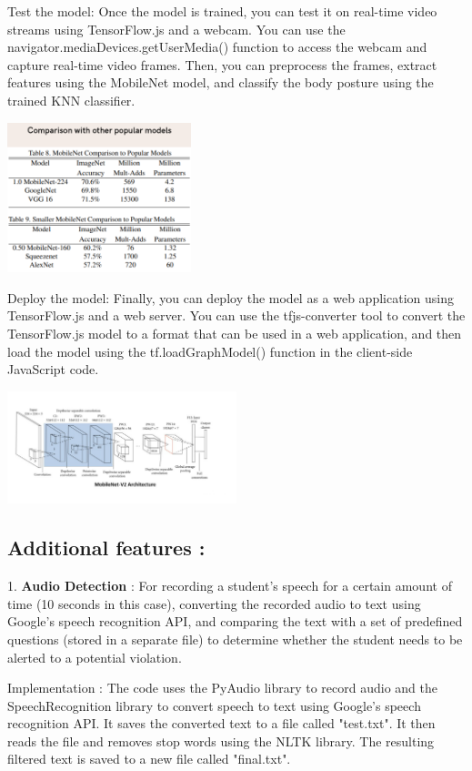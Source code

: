 \documentclass[journal]{IEEEtran}
\begin{document}
Test the model: Once the model is trained, you can test it on real-time video streams using TensorFlow.js and a webcam. You can use the navigator.mediaDevices.getUserMedia() function to access the webcam and capture real-time video frames. Then, you can preprocess the frames, extract features using the MobileNet model, and classify the body posture using the trained KNN classifier.

\includegraphics[width=0.4\textwidth]{img2.png}


Deploy the model: Finally, you can deploy the model as a web application using TensorFlow.js and a web server. You can use the tfjs-converter tool to convert the TensorFlow.js model to a format that can be used in a web application, and then load the model using the tf.loadGraphModel() function in the client-side JavaScript code.

\includegraphics[width=0.5\textwidth]{mobileNet_final.png}


\subsection{Additional features :}
1. \textbf{Audio Detection} : For recording a student's speech for a certain amount of time (10 seconds in this case), converting the recorded audio to text using Google's speech recognition API, and comparing the text with a set of predefined questions (stored in a separate file) to determine whether the student needs to be alerted to a potential violation.

Implementation : 
The code uses the PyAudio library to record audio and the SpeechRecognition library to convert speech to text using Google's speech recognition API. It saves the converted text to a file called "test.txt". It then reads the file and removes stop words using the NLTK library. The resulting filtered text is saved to a new file called "final.txt".
\end{document}
